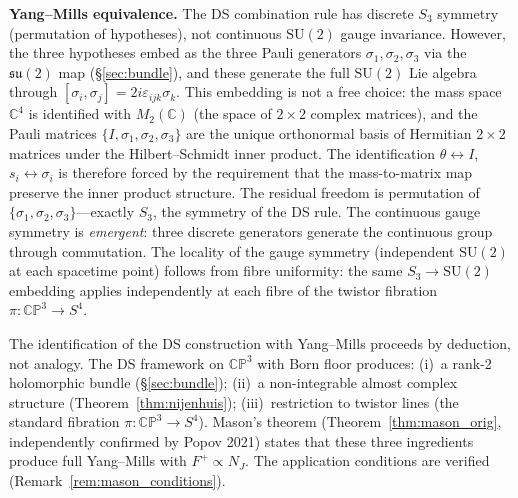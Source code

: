 \documentclass[11pt,a4paper]{article}
\theoremstyle{definition}
\theoremstyle{remark}
\newcommand{\CP}{\mathbb{CP}}
\newcommand{\C}{\mathbb{C}}
\newcommand{\SU}{\mathrm{SU}}
\newcommand{\su}{\mathfrak{su}}
\begin{document}
\textbf{Yang--Mills equivalence.} The DS combination rule has discrete $S_3$ symmetry (permutation of hypotheses), not continuous $\SU(2)$ gauge invariance. However, the three hypotheses embed as the three Pauli generators $\sigma_1,\sigma_2,\sigma_3$ via the $\su(2)$ map (\S\ref{sec:bundle}), and these generate the full $\SU(2)$ Lie algebra through $[\sigma_i,\sigma_j]=2i\varepsilon_{ijk}\sigma_k$. This embedding is not a free choice: the mass space $\C^4$ is identified with $M_2(\C)$ (the space of $2\times 2$ complex matrices), and the Pauli matrices $\{I,\sigma_1,\sigma_2,\sigma_3\}$ are the unique orthonormal basis of Hermitian $2\times 2$ matrices under the Hilbert--Schmidt inner product. The identification $\theta\leftrightarrow I$, $s_i\leftrightarrow\sigma_i$ is therefore forced by the requirement that the mass-to-matrix map preserve the inner product structure. The residual freedom is permutation of $\{\sigma_1,\sigma_2,\sigma_3\}$---exactly $S_3$, the symmetry of the DS rule. The continuous gauge symmetry is \emph{emergent}: three discrete generators generate the continuous group through commutation. The locality of the gauge symmetry (independent $\SU(2)$ at each spacetime point) follows from fibre uniformity: the same $S_3\to\SU(2)$ embedding applies independently at each fibre of the twistor fibration $\pi:\CP^3\to S^4$.

The identification of the DS construction with Yang--Mills proceeds by deduction, not analogy. The DS framework on $\CP^3$ with Born floor produces: (i)~a rank-2 holomorphic bundle (\S\ref{sec:bundle}); (ii)~a non-integrable almost complex structure (Theorem~\ref{thm:nijenhuis}); (iii)~restriction to twistor lines (the standard fibration $\pi:\CP^3\to S^4$). Mason's theorem (Theorem~\ref{thm:mason_orig}, independently confirmed by Popov 2021) states that these three ingredients produce full Yang--Mills with $F^+\propto N_J$. The application conditions are verified (Remark~\ref{rem:mason_conditions}).
\end{document}
